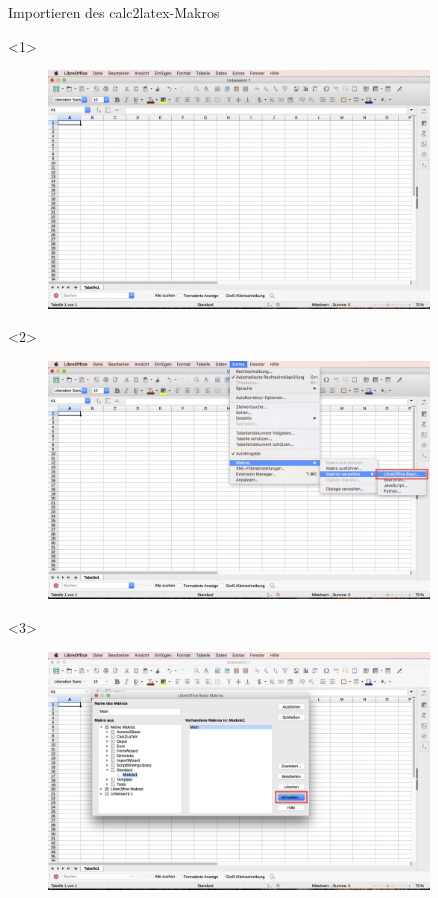 \begin{frame}[c]{Importieren des calc2latex-Makros}
	\begin{onlyenv}
		\begin{figure}[htbp]
			\centering
			\includegraphics[width=0.9\textwidth]{img/Bildschirmfoto_mitKasten/1_Importieren_Macro/1.jpg}
		\end{figure}
	\end{onlyenv}
	\begin{onlyenv}
		\begin{figure}[htbp]
			\centering
			\includegraphics[width=0.9\textwidth]{img/Bildschirmfoto_mitKasten/1_Importieren_Macro/2.jpg}
		\end{figure}
	\end{onlyenv}
	\begin{onlyenv}
		\begin{figure}[htbp]
			\centering
			\includegraphics[width=0.9\textwidth]{img/Bildschirmfoto_mitKasten/1_Importieren_Macro/3.jpg}

\end{figure}
\end{onlyenv}
\end{frame}
